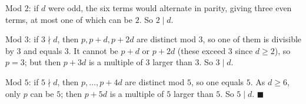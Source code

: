 Mod $2$: if $d$ were odd, the six terms would alternate in parity, giving three even terms, at most one of which can be $2$. So $2\mid d$.

Mod $3$: if $3\nmid d$, then $p,p+d,p+2d$ are distinct mod $3$, so one of them is divisible by $3$ and equals $3$. It cannot be $p+d$ or $p+2d$ (these exceed $3$ since $d\ge2$), so $p=3$; but then $p+3d$ is a multiple of $3$ larger than $3$. So $3\mid d$.

Mod $5$: if $5\nmid d$, then $p,\dots,p+4d$ are distinct mod $5$, so one equals $5$. As $d\ge6$, only $p$ can be $5$; then $p+5d$ is a multiple of $5$ larger than $5$. So $5\mid d$. $\blacksquare$
